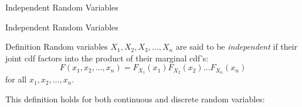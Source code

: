 \documentclass{beamer}
\begin{document}
\begin{frame}{}
    \Huge{Independent Random Variables}
\end{frame}

\begin{frame}{Independent Random Variables}
    \begin{block}{Definition}
        Random variables \(X_1,X_2, X_3, \dots, X_n\) are said to be \textit{independent} if their joint cdf factors into the product of their marginal cdf's:
        \[F(x_1, x_2, \dots, x_n)= F_{X_1}(x_1)F_{X_2}(x_2)\dots F_{X_n}(x_n)\] for all \(x_1, x_2, \dots, x_n\). 
    \end{block}

    This definition holds for both continuous and discrete random variables:
\end{frame}
\end{document}
